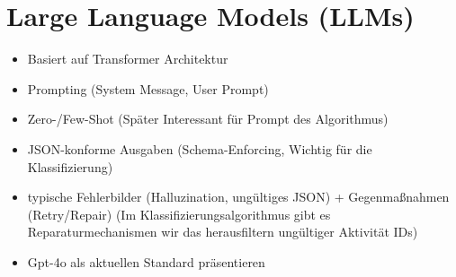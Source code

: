 \section{Large Language Models (LLMs)}\label{sec:llms}

\begin{itemize}
    \item Basiert auf Transformer Architektur
    \item Prompting (System Message, User Prompt)
    \item Zero-/Few-Shot (Später Interessant für Prompt des Algorithmus)
    \item JSON-konforme Ausgaben (Schema-Enforcing, Wichtig für die Klassifizierung)
    \item typische Fehlerbilder (Halluzination, ungültiges JSON) + Gegenmaßnahmen (Retry/Repair) (Im Klassifizierungsalgorithmus gibt es Reparaturmechanismen wir das herausfiltern ungültiger Aktivität IDs)
    \item Gpt-4o als aktuellen Standard präsentieren
\end{itemize}